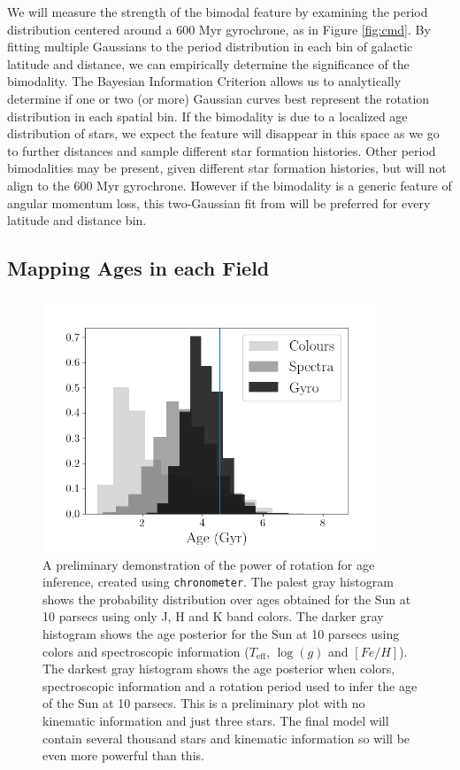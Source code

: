 \documentclass[12pt]{article}
\begin{document}
We will measure the strength of the bimodal feature by examining the period distribution centered around a 600 Myr gyrochrone, as in Figure \ref{fig:cmd}. By fitting multiple Gaussians to the period distribution in each bin of galactic latitude and distance, we can empirically determine the significance of the bimodality. The Bayesian Information Criterion allows us to analytically determine if one or two (or more) Gaussian curves best represent the rotation distribution in each spatial bin.
 If the bimodality is due to a localized age distribution of stars, we expect the feature will disappear in this space as we go to further distances and sample different star formation histories. Other period bimodalities may be present, given different star formation histories, but will not align to the 600 Myr gyrochrone. However if the bimodality is a generic feature of angular momentum loss, this two-Gaussian fit from \citet{davenport2017} will be preferred for every latitude and distance bin.






\subsection{Mapping Ages in each Field}

\begin{figure}[!t]
\centering
\includegraphics[width=4in]{all_hist_working.png}
\caption{A preliminary demonstration of the power of rotation for age
    inference, created using {\tt chronometer}.
    The palest gray histogram shows the probability distribution over ages
    obtained for the Sun at 10 parsecs using only J, H and K band colors.
    The darker gray histogram shows the age posterior for the Sun at 10
    parsecs using colors and spectroscopic information ($T_{\mathrm{eff}}$,
    $\log(g)$ and $[Fe/H]$).
    The darkest gray histogram shows the age posterior when colors,
    spectroscopic information and a rotation period used to infer the age of
    the Sun at 10 parsecs.
    This is a preliminary plot with no kinematic information and just three
    stars.
    The final model will contain several thousand stars and kinematic
    information so will be even more powerful than this.
}
\label{fig:chrono}
\end{figure}
\end{document}
